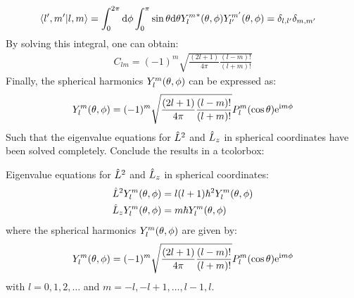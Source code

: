 \begin{align}
    \braket{l',m'|l,m} = \int_0^{2 \pi} \mathrm{d} \phi \int_0^{\pi} \sin \theta \mathrm{d} \theta {Y_{l}^{m}}^* (\theta,\phi) Y_{l'}^{m'} (\theta,\phi) &= \delta_{l,l'} \delta_{m,m'} 
\end{align}
By solving this integral, one can obtain:
\begin{align}
    C_{lm} = (-1)^m \sqrt{\frac{(2l+1)}{4 \pi} \frac{(l-m)!}{(l+m)!}}
\end{align}
Finally, the spherical harmonics $Y_l^m (\theta,\phi)$ can be expressed as:
\begin{align}
    Y_l^m (\theta,\phi) = (-1)^m \sqrt{\frac{(2l+1)}{4 \pi} \frac{(l-m)!}{(l+m)!}} P_l^m(\cos \theta) \mathrm{e}^{\mathrm{i} m \phi} \label{eq:spherical_harmonics}
\end{align}
Such that the eigenvalue equations for $\hat{L}^2$ and $\hat{L}_z$ in spherical coordinates have been solved completely. Conclude the results in a tcolorbox:
\begin{tcolorbox}{Eigenvalue equations for $\hat{L}^2$ and $\hat{L}_z$ in spherical coordinates:}
    \begin{align}
        \hat{L}^2 Y_l^m (\theta,\phi) &= l(l+1) \hbar^2 Y_l^m (\theta,\phi) \\
        \hat{L}_z Y_l^m (\theta,\phi) &= m \hbar Y_l^m (\theta,\phi)
    \end{align} 
    where the spherical harmonics $Y_l^m (\theta,\phi)$ are given by:
    \begin{align}
        Y_l^m (\theta,\phi) = (-1)^m \sqrt{\frac{(2l+1)}{4 \pi} \frac{(l-m)!}{(l+m)!}} P_l^m(\cos \theta) \mathrm{e}^{\mathrm{i} m \phi}
    \end{align}
    with $l = 0, 1, 2, \ldots$ and $m = -l, -l+1, \ldots, l-1, l$.
\end{tcolorbox}


\section{}






































